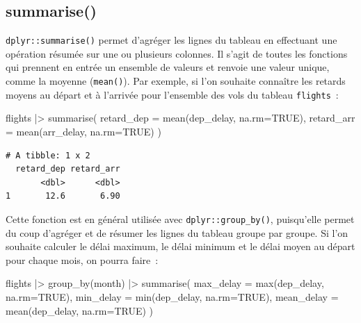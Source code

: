\documentclass[
  letterpaper,
  DIV=11,
  numbers=noendperiod,
  oneside]{scrreprt}
\newenvironment{Shaded}{\begin{snugshade}}{\end{snugshade}}
\newcommand{\AttributeTok}[1]{\textcolor[rgb]{0.40,0.45,0.13}{#1}}
\newcommand{\ConstantTok}[1]{\textcolor[rgb]{0.56,0.35,0.01}{#1}}
\newcommand{\FunctionTok}[1]{\textcolor[rgb]{0.28,0.35,0.67}{#1}}
\newcommand{\NormalTok}[1]{\textcolor[rgb]{0.00,0.23,0.31}{#1}}
\newcommand{\SpecialCharTok}[1]{\textcolor[rgb]{0.37,0.37,0.37}{#1}}
\begin{document}
\hypertarget{summarise}{%
\subsection{summarise()}\label{summarise}}

\texttt{dplyr::summarise()} permet d'agréger les lignes du tableau en
effectuant une opération résumée sur une ou plusieurs colonnes. Il
s'agit de toutes les fonctions qui prennent en entrée un ensemble de
valeurs et renvoie une valeur unique, comme la moyenne
(\texttt{mean()}). Par exemple, si l'on souhaite connaître les retards
moyens au départ et à l'arrivée pour l'ensemble des vols du tableau
\texttt{flights}~:

\begin{Shaded}
\begin{Highlighting}[]
\NormalTok{flights }\SpecialCharTok{|\textgreater{}} 
  \FunctionTok{summarise}\NormalTok{(}
    \AttributeTok{retard\_dep =} \FunctionTok{mean}\NormalTok{(dep\_delay, }\AttributeTok{na.rm=}\ConstantTok{TRUE}\NormalTok{),}
    \AttributeTok{retard\_arr =} \FunctionTok{mean}\NormalTok{(arr\_delay, }\AttributeTok{na.rm=}\ConstantTok{TRUE}\NormalTok{)}
\NormalTok{  )}
\end{Highlighting}
\end{Shaded}

\begin{verbatim}
# A tibble: 1 x 2
  retard_dep retard_arr
       <dbl>      <dbl>
1       12.6       6.90
\end{verbatim}

Cette fonction est en général utilisée avec \texttt{dplyr::group\_by()},
puisqu'elle permet du coup d'agréger et de résumer les lignes du tableau
groupe par groupe. Si l'on souhaite calculer le délai maximum, le délai
minimum et le délai moyen au départ pour chaque mois, on pourra faire~:

\begin{Shaded}
\begin{Highlighting}[]
\NormalTok{flights }\SpecialCharTok{|\textgreater{}}
  \FunctionTok{group\_by}\NormalTok{(month) }\SpecialCharTok{|\textgreater{}}
  \FunctionTok{summarise}\NormalTok{(}
    \AttributeTok{max\_delay =} \FunctionTok{max}\NormalTok{(dep\_delay, }\AttributeTok{na.rm=}\ConstantTok{TRUE}\NormalTok{),}
    \AttributeTok{min\_delay =} \FunctionTok{min}\NormalTok{(dep\_delay, }\AttributeTok{na.rm=}\ConstantTok{TRUE}\NormalTok{),}
    \AttributeTok{mean\_delay =} \FunctionTok{mean}\NormalTok{(dep\_delay, }\AttributeTok{na.rm=}\ConstantTok{TRUE}\NormalTok{)}
\NormalTok{  )}
\end{Highlighting}
\end{Shaded}
\end{document}
